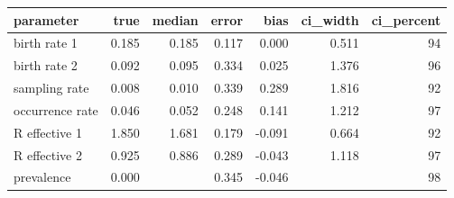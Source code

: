 \begin{table}[ht]
\centering
\begin{tabular}{lrrrrrr}
  \hline
parameter & true & median & error & bias & ci\_width & ci\_percent \\ 
  \hline
birth rate 1 & 0.185 & 0.185 & 0.117 & 0.000 & 0.511 & 94 \\ 
  birth rate 2 & 0.092 & 0.095 & 0.334 & 0.025 & 1.376 & 96 \\ 
  sampling rate & 0.008 & 0.010 & 0.339 & 0.289 & 1.816 & 92 \\ 
  occurrence rate & 0.046 & 0.052 & 0.248 & 0.141 & 1.212 & 97 \\ 
  R effective 1 & 1.850 & 1.681 & 0.179 & -0.091 & 0.664 & 92 \\ 
  R effective 2 & 0.925 & 0.886 & 0.289 & -0.043 & 1.118 & 97 \\ 
  prevalence & 0.000 &  & 0.345 & -0.046 &  & 98 \\ 
   \hline
\end{tabular}
\end{table}

